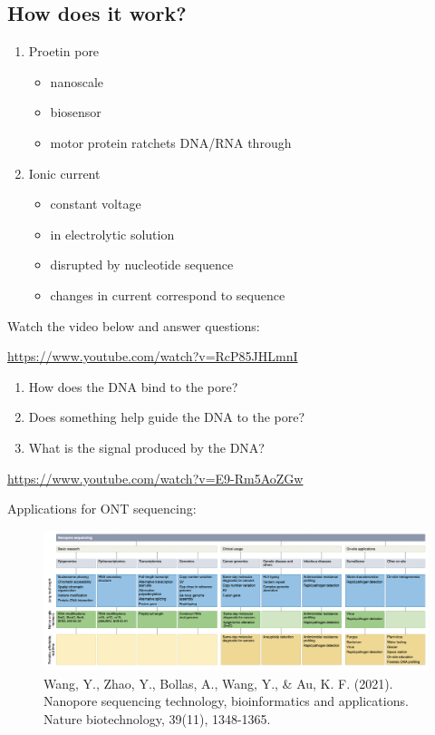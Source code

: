 \documentclass[
]{book}
\providecommand{\tightlist}{%
  \setlength{\itemsep}{0pt}\setlength{\parskip}{0pt}}
\begin{document}
\hypertarget{how-does-it-work}{%
\subsection{How does it work?}\label{how-does-it-work}}

\begin{enumerate}
\def\labelenumi{\arabic{enumi}.}
\tightlist
\item
  Proetin pore

  \begin{itemize}
  \tightlist
  \item
    nanoscale
  \item
    biosensor
  \item
    motor protein ratchets DNA/RNA through
  \end{itemize}
\item
  Ionic current

  \begin{itemize}
  \tightlist
  \item
    constant voltage
  \item
    in electrolytic solution
  \item
    disrupted by nucleotide sequence
  \item
    changes in current correspond to sequence
  \end{itemize}
\end{enumerate}

Watch the video below and answer questions:

\url{https://www.youtube.com/watch?v=RcP85JHLmnI}

\begin{enumerate}
\def\labelenumi{\arabic{enumi}.}
\tightlist
\item
  How does the DNA bind to the pore?
\item
  Does something help guide the DNA to the pore?
\item
  What is the signal produced by the DNA?
\end{enumerate}

\url{https://www.youtube.com/watch?v=E9-Rm5AoZGw}

Applications for ONT sequencing:

\begin{figure}
\centering
\includegraphics[width=1\textwidth,height=\textheight]{./Figures/Nanopore2.png}
\caption{Wang, Y., Zhao, Y., Bollas, A., Wang, Y., \& Au, K. F. (2021). Nanopore sequencing technology, bioinformatics and applications. Nature biotechnology, 39(11), 1348-1365.}
\end{figure}
\end{document}
